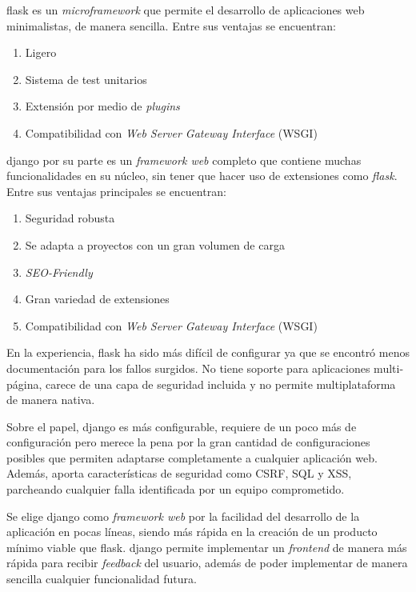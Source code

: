 \Gls{flask} es un \emph{microframework} que permite el desarrollo de aplicaciones web minimalistas, de manera sencilla. Entre sus ventajas se encuentran:
\begin{enumerate}
    \item Ligero
    \item Sistema de test unitarios
    \item Extensión por medio de \emph{plugins}
    \item Compatibilidad con \emph{Web Server Gateway Interface} (WSGI)
\end{enumerate}

\Gls{django} por su parte es un \emph{framework web} completo que contiene muchas funcionalidades en su núcleo, sin tener que hacer uso de extensiones como \emph{flask}. Entre sus ventajas principales se encuentran:
\begin{enumerate}
    \item Seguridad robusta
    \item Se adapta a proyectos con un gran volumen de carga
    \item \emph{SEO-Friendly}
    \item Gran variedad de extensiones
    \item Compatibilidad con \emph{Web Server Gateway Interface} (WSGI)
\end{enumerate}

En la experiencia, \Gls{flask} ha sido más difícil de configurar ya que se encontró menos documentación para los fallos surgidos. No tiene soporte para aplicaciones multi-página, carece de una capa de seguridad incluida y no permite multiplataforma de manera nativa.

Sobre el papel, \Gls{django} es más configurable, requiere de un poco más de configuración pero merece la pena por la gran cantidad de configuraciones posibles que permiten adaptarse completamente a cualquier aplicación web. Además, aporta características de seguridad como \gls{CSRF}, \gls{SQL} y \gls{XSS}, parcheando cualquier falla identificada por un equipo comprometido. \cite{frameworkionos2023}\cite{frameworkkinsta2023}

Se elige \Gls{django} como \emph{framework web} por la facilidad del desarrollo de la aplicación en pocas líneas, siendo más rápida en la creación de un producto mínimo viable que \Gls{flask}. \Gls{django} permite implementar un \emph{frontend} de manera más rápida para recibir \emph{feedback} del usuario, además de poder implementar de manera sencilla cualquier funcionalidad futura.

